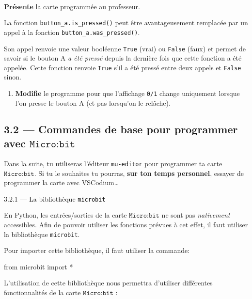 \documentclass[a4paper,17pt]{extarticle}
\newenvironment{eleve}%
{\begin{activite}\color{noiramu}\\[-0.5cm]}
{\end{activite}}
\providecommand{\tightlist}{%
      \setlength{\itemsep}{0pt}\setlength{\parskip}{0pt}}
\newenvironment{Shaded}{}{}
\newcommand{\NormalTok}[1]{{#1}}
\newcommand{\ImportTok}[1]{{#1}}
\newcommand{\OperatorTok}[1]{\textcolor[rgb]{0.40,0.40,0.40}{{#1}}}
\begin{document}
\begin{eleve}
\textbf{Présente} la carte programmée au professeur.

La fonction \texttt{button\_a.is\_pressed()} peut être avantageusement
remplacée par un appel à la fonction \texttt{button\_a.was\_pressed()}.

Son appel renvoie une valeur booléenne \texttt{True} (vrai) ou
\texttt{False} (faux) et permet de savoir si le bouton A \emph{a été
pressé} depuis la dernière fois que cette fonction a été appelée. Cette
fonction renvoie \texttt{True} s'il a été pressé entre deux appels et
\texttt{False} sinon.

\begin{enumerate}
\def\labelenumi{\arabic{enumi}.}
\setcounter{enumi}{5}
\tightlist
\item
  \textbf{Modifie} le programme pour que l'affichage \texttt{0/1} change
  uniquement lorsque l'on presse le bouton A (et pas lorsqu'on le
  relâche).
\end{enumerate}
        
        \end{eleve}
    \hypertarget{commandes-de-base-pour-programmer-avec-textttmicrobit}{%
\subsection{\texorpdfstring{3.2 --- Commandes de base pour programmer
avec
\(\texttt{Micro:bit}\)}{3.2 --- Commandes de base pour programmer avec \textbackslash texttt\{Micro:bit\}}}\label{commandes-de-base-pour-programmer-avec-textttmicrobit}}

    Dans la suite, tu utiliseras l'éditeur \texttt{mu-editor} pour
programmer ta carte \(\texttt{Micro:bit}\). Si tu le souhaites tu
pourras, \textbf{sur ton temps personnel}, essayer de programmer la
carte avec VSCodium\ldots{}

    3.2.1 --- La bibliothèque \texttt{microbit}

    En Python, les entrées/sorties de la carte \(\texttt{Micro:bit}\) ne
sont pas \emph{nativement} accessibles. Afin de pouvoir utiliser les
fonctions prévues à cet effet, il faut utiliser la bibliothèque
\texttt{microbit}.
\begin{exemple}
    Pour importer cette bibliothèque, il faut utiliser la commande:

\begin{Shaded}
\begin{Highlighting}[]
\ImportTok{from}\NormalTok{ microbit }\ImportTok{import} \OperatorTok{*}
\end{Highlighting}
\end{Shaded}

        \end{exemple}
    L'utilisation de cette bibliothèque nous permettra d'utiliser
différentes fonctionnalités de la carte \(\texttt{Micro:bit}\) :
\end{document}
